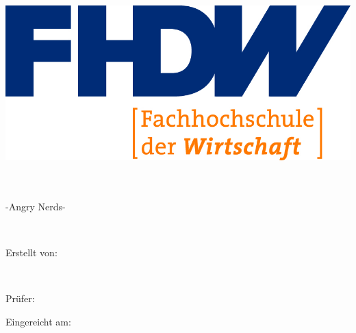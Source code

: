 
\begin{titlepage}

\begin{center}


\includegraphics[scale=1.20]{img/fhdw}\\

\vspace{1.5cm}

\Huge{\bfseries\dokumententyp}

~\vspace{.5cm}\\

\LARGE{\dokumententitel}\\

-Angry Nerds-

~\vspace{.5cm}\\

\large{

Erstellt von:\\\vspace{1mm}

\dokumentenautor\\

\vspace{1.5cm}

Prüfer:\vspace{1mm}\\

\dokumentenpruefer


\vspace{1.5cm}

Eingereicht am:\vspace{1mm}\\

\abgabedatum

}

\end{center}


\end{titlepage}

